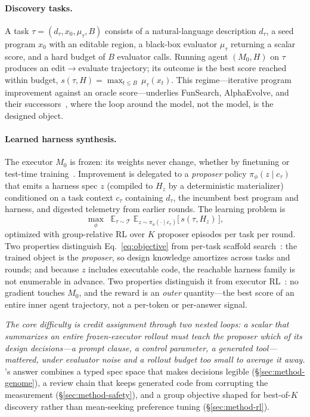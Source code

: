 \paragraph{Discovery tasks.}  A task $\tau = (d_\tau, x_0, \mu_\tau, B)$
consists of a natural-language description $d_\tau$, a seed program $x_0$
with an editable region, a black-box evaluator $\mu_\tau$ returning a scalar
score, and a hard budget of $B$ evaluator calls.  Running agent
$(M_0, H)$ on $\tau$ produces an edit$\to$evaluate trajectory; its outcome
is the best score reached within budget,
$s(\tau, H) = \max_{t \le B}\, \mu_\tau(x_t)$.
This regime---iterative program improvement against an oracle
score---underlies FunSearch, AlphaEvolve, and their
successors~\citep{funsearch,alphaevolve,shinkaevolve}, where the loop around
the model, not the model, is the designed object.

\paragraph{Learned harness synthesis.}  The executor $M_0$ is frozen: its
weights never change, whether by finetuning or test-time
training~\citep{ttt,ttrl}.  Improvement is delegated to a \emph{proposer}
policy $\pi_\phi(z \mid c_\tau)$ that emits a harness spec $z$ (compiled to
$H_z$ by a deterministic materializer) conditioned on a task context
$c_\tau$ containing $d_\tau$, the incumbent best program and harness, and
digested telemetry from earlier rounds.  The learning problem is
\begin{equation}
\max_\phi \;\; \mathbb{E}_{\tau \sim \mathcal{T}} \;
\mathbb{E}_{z \sim \pi_\phi(\cdot \mid c_\tau)}
\big[\, s(\tau, H_z) \,\big],
\label{eq:objective}
\end{equation}
optimized with group-relative RL over $K$ proposer episodes per task per
round.  Two properties distinguish
Eq.~\eqref{eq:objective} from per-task scaffold search~\citep{adas,gepa,
aflow}: the trained object is the \emph{proposer}, so design knowledge
amortizes across tasks and rounds; and because $z$ includes executable
code, the reachable harness family is not enumerable in advance.  Two
properties distinguish it from executor RL~\citep{grpo,agenticrl}: no
gradient touches $M_0$, and the reward is an \emph{outer} quantity---the
best score of an entire inner agent trajectory, not a per-token or
per-answer signal.

\emph{The core difficulty is credit assignment through two nested loops: a
scalar that summarizes an entire frozen-executor rollout must teach the
proposer which of its design decisions---a prompt clause, a control
parameter, a generated tool---mattered, under evaluator noise and a rollout
budget too small to average it away.}  \method{}'s answer combines a typed
spec space that makes decisions legible (\S\ref{sec:method-genome}), a
review chain that keeps generated code from corrupting the measurement
(\S\ref{sec:method-safety}), and a group objective shaped for best-of-$K$
discovery rather than mean-seeking preference tuning
(\S\ref{sec:method-rl}).

